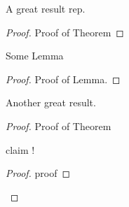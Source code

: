 \documentclass{llncs}
\begin{document}
\begin{theoremrep}
  A great result rep.
\end{theoremrep}
\begin{proof}
  Proof of Theorem
\end{proof}

\begin{lemmarep}
  Some Lemma
\end{lemmarep}
\begin{proof}
  Proof of Lemma.
\end{proof}

\begin{theorem}
  Another great result.
\end{theorem}
\begin{proof}
  Proof of Theorem
  \begin{claimrep}
    claim !
  \end{claimrep}
  \begin{proof}
    proof
  \end{proof}
\end{proof}
\end{document}
